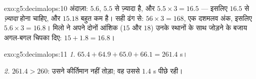 \begin{solution}{exo:g5:decimalops:10}
अंदाज़ा: $5.6$, $5.5$ से ज़्यादा है, और $5.5 \times 3 = 16.5$ ---
इसलिए  $16.5$ से \emph{ज़्यादा} होना चाहिए, और $15.18$ बहुत
कम है। सही ढंग से: $56 \times 3 = 168$, एक दशमलव अंक, इसलिए
$5.6 \times 3 = 16.8$। मिलो ने अपने दोनों आंशिक  ($15$ और
$18$) उनके स्थानों के साथ जोड़ने के बजाय अगल-बगल चिपका दिए:
$15 + 1.8 = 16.8$।
\end{solution}

\begin{solution}{exo:g5:decimalops:11}
\emph{1.} $65.4 + 64.9 + 65.0 + 66.1 = 261.4$ s।

\emph{2.} $261.4 > 260$: उसने कीर्तिमान नहीं तोड़ा; वह उससे
$1.4$ s पीछे रही।
\end{solution}
